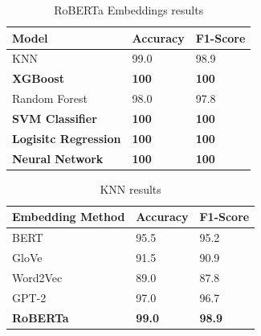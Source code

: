\begin{table}[hbt!]
\begin{threeparttable}
\caption{RoBERTa Embeddings results}
\label{roberta_embeddings_results}
\begin{tabular}{lll}
\toprule
\headrow Model & Accuracy & F1-Score\\
\midrule
 KNN             &       99.0   &       98.9 \\
 \textbf{XGBoost}         &      \textbf{100}   &      \textbf{100}   \\
 Random Forest    &       98.0   &       97.8 \\
 \textbf{SVM Classifier}             &      \textbf{100}   &      \textbf{100}   \\
 \textbf{Logisitc Regression}              &      \textbf{100}   &      \textbf{100}   \\
 \textbf{Neural Network}   &      \textbf{100}   &      \textbf{100}   \\
\bottomrule
\end{tabular}
\end{threeparttable}
\end{table}

\begin{table}[hbt!]
\begin{threeparttable}
\caption{KNN results}
\label{knn_results}
\begin{tabular}{lll}
\toprule
\headrow Embedding Method & Accuracy & F1-Score\\
\midrule
 BERT     &       95.5 &       95.2 \\
 GloVe    &       91.5 &       90.9 \\
 Word2Vec &       89.0 &       87.8 \\
 GPT-2    &       97.0 &       96.7 \\
 \textbf{RoBERTa}  &       \textbf{99.0} &       \textbf{98.9} \\
\bottomrule
\end{tabular}
\end{threeparttable}
\end{table}

